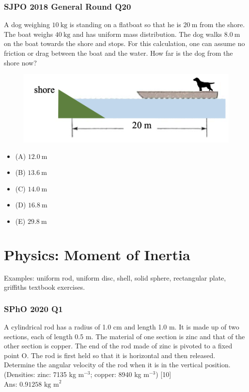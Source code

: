 \documentclass{article}
\begin{document}
\subsubsection{SJPO 2018 General Round Q20}
A dog weighing $10 \mathrm{~kg}$ is standing on a flatboat so that he is $20 \mathrm{~m}$ from the shore. The boat weighs $40 \mathrm{~kg}$ and has uniform mass distribution. The dog walks $8.0 \mathrm{~m}$ on the boat towards the shore and stops. For this calculation, one can assume no friction or drag between the boat and the water. How far is the dog from the shore now? \\
{
\begin{figure}
\includegraphics[width=1.0\linewidth]{images/sjpo2018q20.png}
\end{figure}
\begin{itemize}
\item[] (A) $12.0 \mathrm{~m}$
\item[] (B) $13.6 \mathrm{~m}$
\item[] (C) $14.0 \mathrm{~m}$
\item[] (D) $16.8 \mathrm{~m}$
\item[] (E) $29.8 \mathrm{~m}$
\end{itemize}
}
\clearpage


\section{Physics: Moment of Inertia}
Examples: uniform rod, uniform disc, shell, solid sphere, rectangular plate, griffiths textbook exercises.

\subsubsection{SPhO 2020 Q1}
A cylindrical rod has a radius of 1.0 cm and length 1.0 m. It is made up of two sections, each of length 0.5 m. The material of one section is zinc and that of the other section is copper. The end of the rod made of zinc is pivoted to a fixed point O. The rod is first held so that it is horizontal and then released. Determine the angular velocity of the rod when it is in the vertical position. (Densities: zinc: 7135 kg $\text{m}^{-3}$; copper: 8940 kg $\text{m}^{-3}$) [10]\\
\noindent Ans: $0.91258 \text{ kg m}^2$
\end{document}
